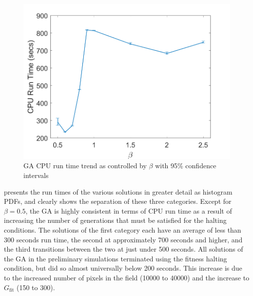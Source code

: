 \documentclass[12pt,dvipsnames]{report}
\begin{document}
\begin{figure}[htp]
	\centering
	\includegraphics[height=0.4\textheight]{Figures/CaseI_GARunTime50_Errorbar}
	\caption[Case I GA CPU run time trends]{GA CPU run time trend as controlled by $\beta$ with 95\% confidence intervals}
	\label{fig:CaseI_GARunTimeErrorbar}
\end{figure}

 presents the run times of the various solutions in greater detail as histogram PDFs, and clearly shows the separation of these three categories.  Except for $\beta = 0.5$, the GA is highly consistent in terms of CPU run time as a result of increasing the number of generations that must be satisfied for the halting conditions.  The solutions of the first category each have an average of less than 300 seconds run time, the second at approximately 700 seconds and higher, and the third transitions between the two at just under 500 seconds.  All solutions of the GA in the preliminary simulations terminated using the fitness halting condition, but did so almost universally below 200 seconds.  This increase is due to the increased number of pixels in the field (10000 to 40000) and the increase to $G_{\text{fit}}$ (150 to 300).
\end{document}
